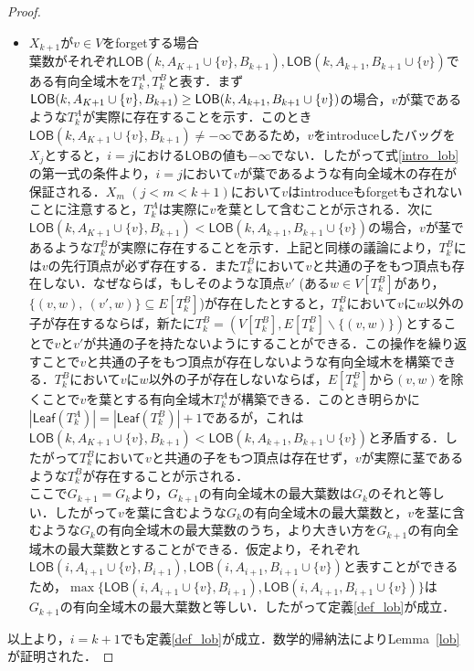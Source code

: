 \documentclass[master]{kuisthesis}		%
\theoremstyle{plain}
\theoremstyle{definition}
\begin{document}
\begin{proof}
\begin{itemize}
        \item $X_{k+1}$が$v \in V$をforgetする場合 \\
        葉数がそれぞれ$\mathsf{LOB}(k, A_{K+1} \cup \{v\}, B_{k+1}), \mathsf{LOB}(k, A_{k+1}, B_{k+1} \cup \{v\})$である有向全域木を$T^A_k, T^B_k$と表す．まず$\mathsf{LOB}(k, A_{K+1} \cup \{v\}, B_{k+1}) \geq \\\mathsf{LOB}(k, A_{k+1}, B_{k+1} \cup \{v\})$の場合，$v$が葉であるような$T^A_k$が実際に存在することを示す．このとき$\mathsf{LOB}(k, A_{K+1} \cup \{v\}, B_{k+1}) \neq -\infty$であるため，$v$をintroduceしたバッグを$X_j$とすると，$i=j$における$\mathsf{LOB}$の値も$-\infty$でない．したがって式\ref{intro_lob}の第一式の条件より，$i=j$において$v$が葉であるような有向全域木の存在が保証される．$X_m$ $(j < m < k+1)$において$v$はintroduceもforgetもされないことに注意すると，$T^A_k$は実際に$v$を葉として含むことが示される．次に$\mathsf{LOB}(k, A_{K+1} \cup \{v\}, B_{k+1}) < \mathsf{LOB}(k, A_{k+1}, B_{k+1} \cup \{v\})$の場合，$v$が茎であるような$T^B_k$が実際に存在することを示す．上記と同様の議論により，$T^B_k$には$v$の先行頂点が必ず存在する．また$T^B_k$において$v$と共通の子をもつ頂点も存在しない．なぜならば，もしそのような頂点$v'$ (ある$w \in V[T^B_k]$があり，$\{(v, w),\ (v', w)\} \subseteq E[T^B_k]$)が存在したとすると，$T^B_k$において$v$に$w$以外の子が存在するならば，新たに$T^B_k = (V[T^B_k], E[T^B_k] \backslash \{(v, w)\})$とすることで$v$と$v'$が共通の子を持たないようにすることができる．この操作を繰り返すことで$v$と共通の子をもつ頂点が存在しないような有向全域木を構築できる．$T^B_k$において$v$に$w$以外の子が存在しないならば，$E[T^B_k]$から$(v, w)$を除くことで$v$を葉とする有向全域木$T^A_k$が構築できる．このとき明らかに$|\mathsf{Leaf}(T^A_k)| = |\mathsf{Leaf}(T^B_k)| + 1$であるが，これは$\mathsf{LOB}(k, A_{K+1} \cup \{v\}, B_{k+1}) < \mathsf{LOB}(k, A_{k+1}, B_{k+1} \cup \{v\})$と矛盾する．したがって$T^B_k$において$v$と共通の子をもつ頂点は存在せず，$v$が実際に茎であるような$T^B_k$が存在することが示される．\\
        ここで$G_{k+1} = G_k$より，$G_{k+1}$の有向全域木の最大葉数は$G_k$のそれと等しい．したがって$v$を葉に含むような$G_k$の有向全域木の最大葉数と，$v$を茎に含むような$G_k$の有向全域木の最大葉数のうち，より大きい方を$G_{k+1}$の有向全域木の最大葉数とすることができる．仮定より，それぞれ$\mathsf{LOB}(i, A_{i+1} \cup \{v\}, B_{i+1}), \mathsf{LOB}(i, A_{i+1}, B_{i+1} \cup \{v\})$と表すことができるため，$\max \{\mathsf{LOB}(i, A_{i+1} \cup \{v\}, B_{i+1}), \mathsf{LOB}(i, A_{i+1}, B_{i+1} \cup \{v\})\}$は$G_{k+1}$の有向全域木の最大葉数と等しい．したがって定義\ref{def_lob}が成立．
    \end{itemize}
    以上より，$i = k+1$でも定義\ref{def_lob}が成立．数学的帰納法によりLemma~\ref{lob}が証明された．
\end{proof}
\end{document}
